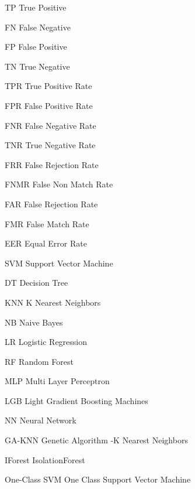 \documentclass[12pt,oneside,final]{vlsithesis}
\begin{document}
{}
\begin{abbrv}
\item[TP] True Positive
\item[FN] False Negative
\item[FP] False Positive
\item[TN] True Negative
\item[TPR] True Positive Rate
\item[FPR] False Positive Rate
\item[FNR] False Negative Rate
\item[TNR] True Negative Rate
\item[FRR] False Rejection Rate
\item[FNMR] False Non Match Rate
\item[FAR] False Rejection Rate
\item[FMR] False Match Rate
\item[EER] Equal Error Rate
\item[SVM] Support Vector Machine
\item[DT] Decision Tree
\item[KNN] K Nearest Neighbors
\item[NB] Naive Bayes
\item[LR] Logistic Regression
\item[RF] Random Forest
\item[MLP] Multi Layer Perceptron
\item[LGB] Light Gradient Boosting Machines
\item[NN] Neural Network
\item[GA-KNN] Genetic Algorithm -K Nearest Neighbors
\item[IForest] IsolationForest
\item[One-Class SVM] One Class Support Vector Machine 
\end{abbrv}

\clearpage
{}







% 
\end{document}
